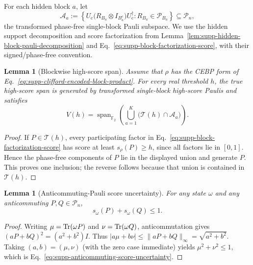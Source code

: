 \documentclass[
  aps,
  prx,
  reprint,
  superscriptaddress,
  amsmath,
  amssymb,
  nofootinbib,
  longbibliography
]{revtex4-2}
\newtheorem{lemma}[theorem]{Lemma}
\newcommand{\Span}{\operatorname{span}}
\newcommand{\Pc}{\mathcal{P}}
\newcommand{\Fc}{\mathbb{F}_2}
\begin{document}
For each hidden block $a$, let
\begin{equation}
\mathcal A_a
:=
\left\{
U_{\mathrm c}
\bigl(R_{B_a}\otimes I_{B_a^c}\bigr)
U_{\mathrm c}^\dagger
:
R_{B_a}\in\Pc_{B_a}
\right\}
\subseteq
\Pc_n,
\end{equation}
the transformed phase-free single-block Pauli subspace.  We use the hidden
support decomposition and score factorization from
Lemma~\ref{lem:supp-hidden-block-pauli-decomposition} and
Eq.~\eqref{eq:supp-block-factorization-score}, with their signed/phase-free
convention.

\begin{lemma}[Blockwise high-score span]
\label{lem:supp-blockwise-high-score-span}
Assume that $\rho$ has the CEBP form of
Eq.~\eqref{eq:supp-clifford-encoded-block-product}.  For every real threshold
$h$, the true high-score span is generated by transformed single-block
high-score Paulis and satisfies
\begin{equation}
V(h)
=
\Span_{\Fc}
\left(
\bigcup_{a=1}^K
\bigl(\mathcal T(h)\cap\mathcal A_a\bigr)
\right).
\label{eq:supp-blockwise-high-score-span}
\end{equation}
\end{lemma}

\begin{proof}
If $P\in\mathcal T(h)$, every participating factor in
Eq.~\eqref{eq:supp-block-factorization-score} has score at least
$s_\rho(P)\ge h$, since all factors lie in $[0,1]$.  Hence the phase-free
components of $P$ lie in the displayed union and generate $P$.  This proves
one inclusion; the reverse follows because that union is contained in
$\mathcal T(h)$.
\end{proof}

\begin{lemma}[Anticommuting-Pauli score uncertainty]
\label{lem:supp-anticommuting-pauli-score-uncertainty}
For any state $\omega$ and any anticommuting $P,Q\in\Pc_n$,
\begin{equation}
s_\omega(P)+s_\omega(Q)\le1.
\label{eq:supp-anticommuting-score-uncertainty}
\end{equation}
\end{lemma}

\begin{proof}
Writing $\mu=\Tr(\omega P)$ and $\nu=\Tr(\omega Q)$, anticommutation gives
$(aP+bQ)^2=(a^2+b^2)I$.  Thus
$|a\mu+b\nu|\le\|aP+bQ\|_\infty=\sqrt{a^2+b^2}$.  Taking
$(a,b)=(\mu,\nu)$ (with the zero case immediate) yields
$\mu^2+\nu^2\le1$, which is
Eq.~\eqref{eq:supp-anticommuting-score-uncertainty}.
\end{proof}
\end{document}
